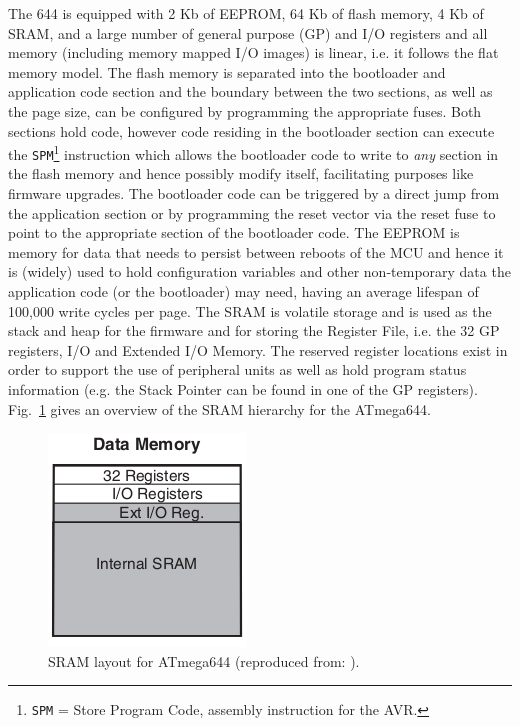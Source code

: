 The 644 is equipped with 2 Kb of EEPROM, 64 Kb of flash memory, 4 Kb of SRAM, and a large number of general purpose (GP) and I/O registers and all memory (including memory mapped I/O images) is linear, i.e. it follows the flat memory model. The flash memory is separated into the bootloader and application code section and the boundary between the two sections, as well as the page size, can be configured by programming the appropriate fuses. Both sections hold code, however code residing in the bootloader section can execute the \texttt{SPM}\footnote{\texttt{SPM} = Store Program Code, assembly instruction for the AVR.} instruction which allows the bootloader code to write to \textit{any} section in the flash memory and hence possibly modify itself, facilitating purposes like firmware upgrades. The bootloader code can be triggered by a direct jump from the application section or by programming the reset vector via the reset fuse to point to the appropriate section of the bootloader code. The EEPROM is memory for data that needs to persist between reboots of the MCU and hence it is (widely) used to hold configuration variables and other non-temporary data the application code (or the bootloader) may need, having an average lifespan of 100,000 write cycles per page. The SRAM is volatile storage and is used as the stack and heap for the firmware and for storing the Register File, i.e. the 32 GP registers, I/O and Extended I/O Memory. The reserved register locations exist in order to support the use of peripheral units as well as hold program status information (e.g. the Stack Pointer can be found in one of the GP registers). Fig.~\ref{fig:stack} gives an overview of the SRAM hierarchy for the ATmega644.
\begin{figure}
\center
\includegraphics[scale=0.7]{img/stack.png}
\caption{\footnotesize SRAM layout for ATmega644 (reproduced from: \protect\citep{atmega_manual}).}
\label{fig:stack} 
\end{figure}

